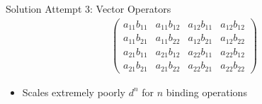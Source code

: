\documentclass[handout,aspectratio=169]{beamer}
\begin{document}
\begin{frame}{Solution Attempt 3: Vector Operators}
\begin{align*}
\begin{pmatrix}
		a_{11} b_{11} & a_{11} b_{12} & a_{12} b_{11} & a_{12} b_{12} \\
		a_{11} b_{21} & a_{11} b_{22} & a_{12} b_{21} & a_{12} b_{22} \\
		a_{21} b_{11} & a_{21} b_{12} & a_{22} b_{11} & a_{22} b_{12} \\
		a_{21} b_{21} & a_{21} b_{22} & a_{22} b_{21} & a_{22} b_{22}
		\end{pmatrix}
		\end{align*}
		\vspace*{-0.25cm}
		\begin{itemize}
			\centering
			\item<2->[\OMinus] Scales extremely poorly $d^n$ for $n$ binding operations
		\end{itemize}
	\end{frame}
\end{document}
